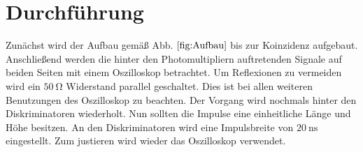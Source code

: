 
\section{Durchführung}
\label{sec:Durchführung}
Zunächst wird der Aufbau gemäß Abb. $\ref{fig:Aufbau}$ bis zur Koinzidenz aufgebaut. Anschließend werden die hinter den Photomultipliern auftretenden Signale auf beiden Seiten mit einem Oszilloskop betrachtet.
Um Reflexionen zu vermeiden wird ein $\SI{50}{\ohm}$ Widerstand parallel geschaltet. Dies ist bei allen weiteren Benutzungen des Oszilloskop zu beachten. Der Vorgang wird nochmals hinter den Diskriminatoren wiederholt. Nun sollten die Impulse eine einheitliche Länge und Höhe besitzen. An den Diskriminatoren wird eine Impulsbreite von $\SI{20}{\nano\second}$ eingestellt. Zum justieren wird wieder das Oszilloskop verwendet.
